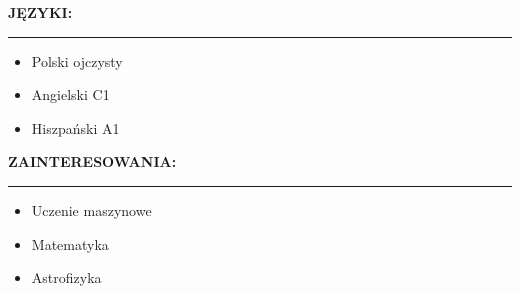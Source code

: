 \documentclass[10pt]{article}
\newcommand{\longline}{\rule{19.6cm}{1pt}}
\begin{document}
\noindent \fontsize{14pt}{14pt}\selectfont \textbf{\color{Violet}JĘZYKI:}
\fontsize{10pt}{10pt}\selectfont
\\
\noindent \longline 
\begin{itemize}[leftmargin=*]
    \item Polski ojczysty
    \item Angielski C1
    \item Hiszpański A1
\end{itemize}

\noindent \fontsize{14pt}{14pt}\selectfont \textbf{\color{Violet}ZAINTERESOWANIA:}
\fontsize{10pt}{10pt}\selectfont
\\
\noindent \longline 
\begin{itemize}[leftmargin=*]
    \item Uczenie maszynowe
    \item Matematyka
    \item Astrofizyka
\end{itemize}
\end{document}
